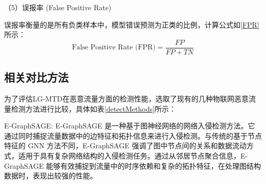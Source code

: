 \documentclass[promaster]{thesis-uestc}
\begin{document}
（5）误报率 (False Positive Rate)

误报率衡量的是所有负类样本中，模型错误预测为正类的比例，计算公式如\ref{FPR}所示：
\begin{equation}
\text{False Positive Rate (FPR)} = \frac{FP}{FP + TN}
\label{FPR}
\end{equation}

\subsection{相关对比方法}
为了评估LG-MTD在恶意流量方面的检测性能，选取了现有的几种物联网恶意流量检测方法进行比较，具体如表\ref{detectMethods}所示：



\begin{table}[h!]
\centering
\caption{恶意流量检测方法对比}
\label{detectMethods}
\end{table}
E-GraphSAGE: E-GraphSAGE 是一种基于图神经网络的网络入侵检测方法。它通过同时捕捉流量数据中的边特征和拓扑信息来进行入侵检测。与传统的基于节点特征的 GNN 方法不同，E-GraphSAGE 强调了图中节点间的关系和数据流动方式，适用于具有复杂网络结构的入侵检测任务。通过从邻居节点聚合信息，E-GraphSAGE 能够有效捕捉到流量中的时序依赖和复杂的拓扑特征，在处理图结构数据时，表现出较强的性能。
\end{document}
